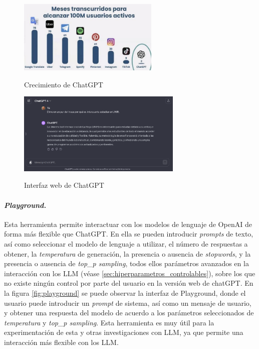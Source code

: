         \begin{figure}[h]
            \caption[Crecimiento de ChatGPT]{Crecimiento de ChatGPT}
            \centering
            \includegraphics[width=0.6\textwidth]{./figuras/100millonesUsuariosChatgpt.jpeg}
            \label{fig:crecimiento_chatgpt}
        \end{figure}

        \begin{figure}[h]
            \caption[Interfaz web de ChatGPT]{Interfaz web de ChatGPT}
            \centering
            \includegraphics[width=0.7\textwidth]{./figuras/interfaz_chatgpt.png}
            \label{fig:chatgpt}
        \end{figure}

        \paragraph{\textit{Playground.}} Esta herramienta permite interactuar con los modelos de lenguaje de OpenAI de forma más flexible que ChatGPT. En ella se pueden introducir \textit{prompts} de texto, así como seleccionar el modelo de lenguaje a utilizar, el número de respuestas a obtener, la \textit{temperatura} de generación, la presencia o ausencia de \textit{stopwords}, y la presencia o ausencia de \textit{top\_p sampling}, todos ellos parámetros avanzados en la interacción con los LLM (véase \ref{sec:hiperparametros_controlables}), sobre los que no existe ningún control por parte del usuario en la versión web de chatGPT. En la figura \ref{fig:playground} se puede observar la interfaz de Playground, donde el usuario puede introducir un \textit{prompt} de sistema, así como un mensaje de usuario, y obtener una respuesta del modelo de acuerdo a los parámetros seleccionados de \textit{temperatura} y \textit{top\_p sampling}. Esta herramienta es muy útil para la experimentación de esta y otras investigaciones con LLM, ya que permite una interacción más flexible con los LLM.

